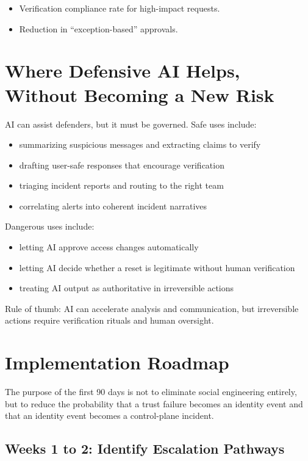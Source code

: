 \documentclass[11pt]{article}
\begin{document}
\begin{itemize}[leftmargin=1.5em]
    \item Verification compliance rate for high-impact requests.
    \item Reduction in ``exception-based'' approvals.
\end{itemize}

\section{Where Defensive AI Helps, Without Becoming a New Risk}

AI can assist defenders, but it must be governed. Safe uses include:

\begin{itemize}[leftmargin=1.5em]
    \item summarizing suspicious messages and extracting claims to verify
    \item drafting user-safe responses that encourage verification
    \item triaging incident reports and routing to the right team
    \item correlating alerts into coherent incident narratives
\end{itemize}

Dangerous uses include:

\begin{itemize}[leftmargin=1.5em]
    \item letting AI approve access changes automatically
    \item letting AI decide whether a reset is legitimate without human verification
    \item treating AI output as authoritative in irreversible actions
\end{itemize}

Rule of thumb: AI can accelerate analysis and communication, but irreversible actions require verification rituals and human oversight.

\section{Implementation Roadmap}

The purpose of the first 90 days is not to eliminate social engineering entirely, but to reduce the probability that a trust failure becomes an identity event and that an identity event becomes a control-plane incident.

\subsection{Weeks 1 to 2: Identify Escalation Pathways}
\end{document}

